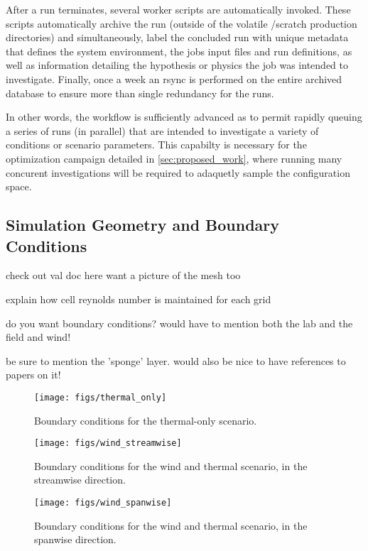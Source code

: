After a run terminates, several worker scripts are automatically invoked. 
These scripts automatically archive the run (outside of the volatile /scratch 
production directories) and simultaneously, label the concluded run with unique metadata
that defines the system environment, the jobs input files and run definitions, as well as 
information detailing the hypothesis or physics the job was intended to investigate.
Finally, once a week an rsync is performed on the entire archived database to ensure 
more than single redundancy for the runs.

In other words, the workflow is sufficiently advanced as to permit rapidly queuing 
a series of runs (in parallel) that are intended to investigate a variety of conditions or 
scenario parameters. This capabilty is necessary for the optimization campaign detailed 
in \ref{sec:proposed_work}, where running many concurent investigations will be required to
adaquetly sample the configuration space. 

\subsection{Simulation Geometry and Boundary Conditions}

check out val doc here
want a picture of the mesh too

explain how cell reynolds number is maintained for each grid

do you want boundary conditions? would have to mention both the lab and
the field and wind!

be sure to mention the 'sponge' layer. would also be nice to have references to papers on it!

\begin{figure}[!htb]
  \begin{center}
    \texttt{[image: figs/thermal\_only]}
    \caption{Boundary conditions for the thermal-only scenario. }
    \label{fig:thermalbc}
  \end{center}
\end{figure}

\begin{figure}[!htb]
  \begin{center}
    \texttt{[image: figs/wind\_streamwise]}
    \caption{Boundary conditions for the wind and thermal scenario, in the streamwise direction.}
    \label{fig:windstream}
  \end{center}
\end{figure}

\begin{figure}[!htb]
  \begin{center}
    \texttt{[image: figs/wind\_spanwise]}
    \caption{Boundary conditions for the wind and thermal scenario, in the spanwise direction. }
    \label{fig:windspan}
  \end{center}
\end{figure}
